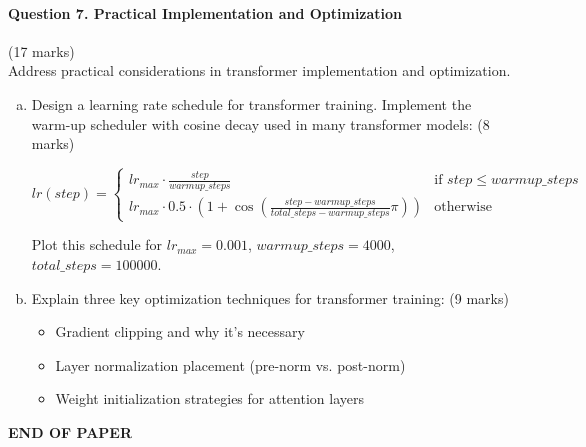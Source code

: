 \documentclass[12pt]{article}
\newcommand{\mediumanswer}{\vspace{3cm}}         %
\begin{document}
\newpage
\paragraph{Question 7. Practical Implementation and Optimization}\hfill (17 marks)\\
Address practical considerations in transformer implementation and optimization.

\begin{enumerate}[(a)]
    \item Design a learning rate schedule for transformer training. Implement the warm-up scheduler with cosine decay used in many transformer models: \hfill (8 marks)
    
    $$lr(step) = \begin{cases} 
    lr_{max} \cdot \frac{step}{warmup\_steps} & \text{if } step \leq warmup\_steps \\
    lr_{max} \cdot 0.5 \cdot \left(1 + \cos\left(\frac{step - warmup\_steps}{total\_steps - warmup\_steps} \pi\right)\right) & \text{otherwise}
    \end{cases}$$
    
    Plot this schedule for $lr_{max} = 0.001$, $warmup\_steps = 4000$, $total\_steps = 100000$.
    
    \mediumanswer
    
    \item Explain three key optimization techniques for transformer training: \hfill (9 marks)
    \begin{itemize}
        \item Gradient clipping and why it's necessary
        \item Layer normalization placement (pre-norm vs. post-norm)
        \item Weight initialization strategies for attention layers
    \end{itemize}
    
    \mediumanswer
\end{enumerate}

\vfill
\begin{center}{\bf END OF PAPER}\end{center}
\end{document}
